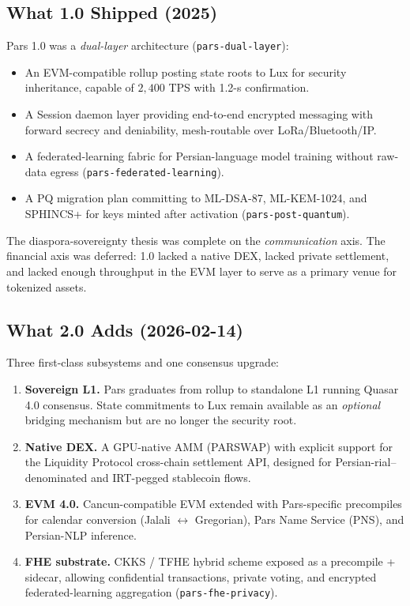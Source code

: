 \documentclass[11pt,a4paper]{article}
\begin{document}
\subsection{What 1.0 Shipped (2025)}

Pars 1.0 was a \emph{dual-layer} architecture (\texttt{pars-dual-layer}):
\begin{itemize}[leftmargin=*]
\item An EVM-compatible rollup posting state roots to Lux for security
inheritance, capable of $2{,}400$ TPS with 1.2-s confirmation.
\item A Session daemon layer providing end-to-end encrypted messaging with
forward secrecy and deniability, mesh-routable over LoRa/Bluetooth/IP.
\item A federated-learning fabric for Persian-language model training
without raw-data egress (\texttt{pars-federated-learning}).
\item A PQ migration plan committing to ML-DSA-87, ML-KEM-1024, and
SPHINCS+ for keys minted after activation
(\texttt{pars-post-quantum}).
\end{itemize}

The diaspora-sovereignty thesis was complete on the \emph{communication}
axis. The financial axis was deferred: 1.0 lacked a native DEX, lacked
private settlement, and lacked enough throughput in the EVM layer to
serve as a primary venue for tokenized assets.

\subsection{What 2.0 Adds (2026-02-14)}

Three first-class subsystems and one consensus upgrade:
\begin{enumerate}[leftmargin=*]
\item \textbf{Sovereign L1.} Pars graduates from rollup to standalone L1
running Quasar 4.0 consensus. State commitments to Lux remain available
as an \emph{optional} bridging mechanism but are no longer the security
root.
\item \textbf{Native DEX.} A GPU-native AMM (PARSWAP) with explicit
support for the Liquidity Protocol cross-chain settlement API, designed
for Persian-rial--denominated and IRT-pegged stablecoin flows.
\item \textbf{EVM 4.0.} Cancun-compatible EVM extended with Pars-specific
precompiles for calendar conversion (Jalali $\leftrightarrow$ Gregorian),
Pars Name Service (PNS), and Persian-NLP inference.
\item \textbf{FHE substrate.} CKKS / TFHE hybrid scheme exposed as a
precompile + sidecar, allowing confidential transactions, private
voting, and encrypted federated-learning aggregation
(\texttt{pars-fhe-privacy}).
\end{enumerate}
\end{document}
